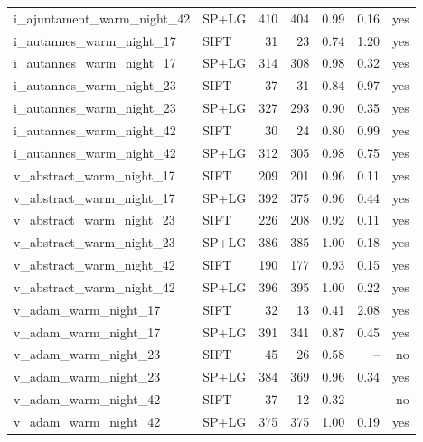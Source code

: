 \begin{longtable}{llrrrrr}
i\_ajuntament\_warm\_night\_42 & SP+LG & 410 & 404 & 0.99 & 0.16 & yes \\
i\_autannes\_warm\_night\_17 & SIFT & 31 & 23 & 0.74 & 1.20 & yes \\
i\_autannes\_warm\_night\_17 & SP+LG & 314 & 308 & 0.98 & 0.32 & yes \\
i\_autannes\_warm\_night\_23 & SIFT & 37 & 31 & 0.84 & 0.97 & yes \\
i\_autannes\_warm\_night\_23 & SP+LG & 327 & 293 & 0.90 & 0.35 & yes \\
i\_autannes\_warm\_night\_42 & SIFT & 30 & 24 & 0.80 & 0.99 & yes \\
i\_autannes\_warm\_night\_42 & SP+LG & 312 & 305 & 0.98 & 0.75 & yes \\
v\_abstract\_warm\_night\_17 & SIFT & 209 & 201 & 0.96 & 0.11 & yes \\
v\_abstract\_warm\_night\_17 & SP+LG & 392 & 375 & 0.96 & 0.44 & yes \\
v\_abstract\_warm\_night\_23 & SIFT & 226 & 208 & 0.92 & 0.11 & yes \\
v\_abstract\_warm\_night\_23 & SP+LG & 386 & 385 & 1.00 & 0.18 & yes \\
v\_abstract\_warm\_night\_42 & SIFT & 190 & 177 & 0.93 & 0.15 & yes \\
v\_abstract\_warm\_night\_42 & SP+LG & 396 & 395 & 1.00 & 0.22 & yes \\
v\_adam\_warm\_night\_17 & SIFT & 32 & 13 & 0.41 & 2.08 & yes \\
v\_adam\_warm\_night\_17 & SP+LG & 391 & 341 & 0.87 & 0.45 & yes \\
v\_adam\_warm\_night\_23 & SIFT & 45 & 26 & 0.58 & -- & no \\
v\_adam\_warm\_night\_23 & SP+LG & 384 & 369 & 0.96 & 0.34 & yes \\
v\_adam\_warm\_night\_42 & SIFT & 37 & 12 & 0.32 & -- & no \\
v\_adam\_warm\_night\_42 & SP+LG & 375 & 375 & 1.00 & 0.19 & yes \\
\end{longtable}\endgroup
